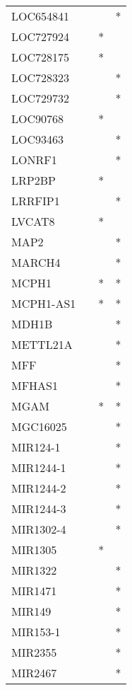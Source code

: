 \begin{longtable}{lccc}
LOC654841      &       &    &       * \\
LOC727924      &       &  * &         \\
LOC728175      &       &  * &         \\
LOC728323      &       &    &       * \\
LOC729732      &       &    &       * \\
LOC90768       &       &  * &         \\
LOC93463       &       &    &       * \\
LONRF1         &       &    &       * \\
LRP2BP         &       &  * &         \\
LRRFIP1        &       &    &       * \\
LVCAT8         &       &  * &         \\
MAP2           &       &    &       * \\
MARCH4         &       &    &       * \\
MCPH1          &       &  * &       * \\
MCPH1-AS1      &       &  * &       * \\
MDH1B          &       &    &       * \\
METTL21A       &       &    &       * \\
MFF            &       &    &       * \\
MFHAS1         &       &    &       * \\
MGAM           &       &  * &       * \\
MGC16025       &       &    &       * \\
MIR124-1       &       &    &       * \\
MIR1244-1      &       &    &       * \\
MIR1244-2      &       &    &       * \\
MIR1244-3      &       &    &       * \\
MIR1302-4      &       &    &       * \\
MIR1305        &       &  * &         \\
MIR1322        &       &    &       * \\
MIR1471        &       &    &       * \\
MIR149         &       &    &       * \\
MIR153-1       &       &    &       * \\
MIR2355        &       &    &       * \\
MIR2467        &       &    &       * \\

\end{longtable}
